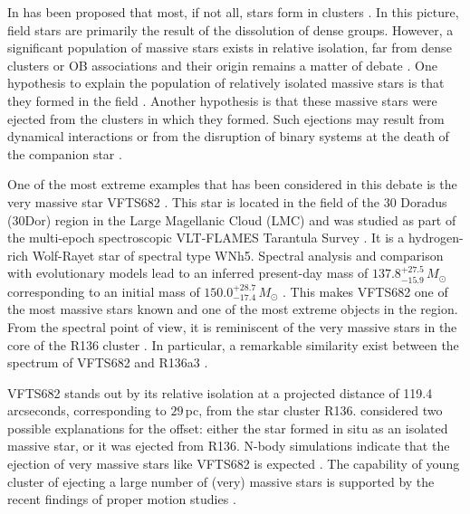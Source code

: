 \documentclass[a4paper,fleqn,usenatbib]{mnras}
\newcommand{\Msun}{{\,\mathrm{M}_\odot}}
\begin{document}
In has been proposed that most, if not all, stars form in clusters
\citep{lada:03}. In this picture, field stars are primarily the result
of the dissolution of dense groups.  However, a significant population
of massive stars exists in relative isolation, far from dense clusters
or OB associations and their origin remains a matter of debate
\citep{gvaramadze:12, lamb:16,ward:18}. One hypothesis to explain
the population of relatively isolated massive stars is that they
formed in the field \citep[e.g.,][]{parker:07}. Another
hypothesis is that these massive stars were ejected from the clusters
in which they formed. Such ejections may result from dynamical interactions \citep[e.g.,][]{poveda:67} or from the disruption of binary systems at the death of the companion  star \citep[e.g.,][]{blaauw:61, renzo:18}. 
 

One of the most extreme examples that has been considered in this
debate is the very massive star VFTS682  \citep[][]{bestenlehner:11,
  bressert:12}. This star is located in the field of the 30 Doradus
(30Dor) region in the Large Magellanic Cloud (LMC) and was studied as part of the multi-epoch spectroscopic VLT-FLAMES Tarantula Survey \citep[VFTS,][]{evans:11}. It is a hydrogen-rich Wolf-Rayet star of spectral type WNh5. Spectral analysis and comparison with evolutionary models lead to an inferred present-day mass of $137.8^{+27.5}_{-15.9}\,M_\odot$ corresponding to an initial mass of $150.0^{+28.7}_{-17.4}\,M_\odot$
\citep{schneider:18}. 
This makes VFTS682 one of the most massive stars known and one of the most extreme objects in the region.
From the spectral point of view, it is reminiscent of the very
massive stars in the core of the R136 cluster \citep{dekoter:97,crowther:10, crowther:16}. 
In particular, a remarkable similarity exist between the
spectrum of VFTS682 and R136a3 \citep{rubio-diez:17}.%

VFTS682 stands out by its relative isolation at a projected distance of 119.4 arcseconds, corresponding to 
$29$\,pc, from  the star cluster R136. \citet{bestenlehner:11}
considered two possible explanations for the offset: either
the star formed in situ as an isolated massive star, or it was ejected from  R136. N-body simulations 
indicate that the ejection of very massive stars like VFTS682 is
expected \citep[e.g.][]{fujii:11, banerjee:12}. The capability of
young cluster of ejecting a large number of (very) massive stars is supported by
the recent findings of proper motion studies \citep[e.g.,][]{lennon:18, drew:18}.
\end{document}

